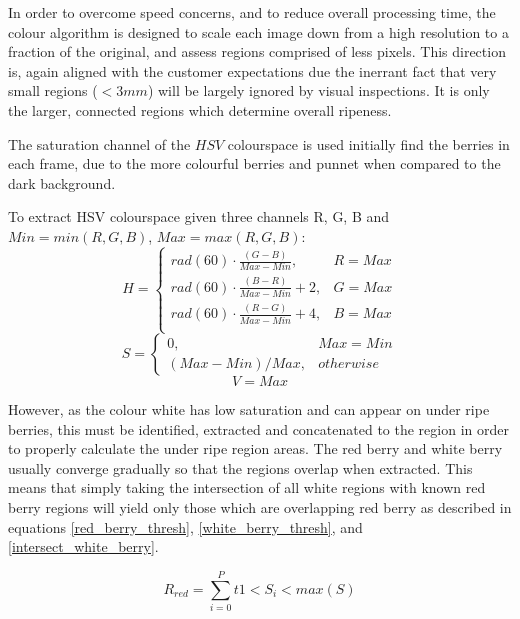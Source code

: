 \documentclass[fleqn,twoside,12pt]{report}
\begin{document}
In order to overcome speed concerns, and to reduce overall processing time, the colour algorithm is designed to scale each image down from a high resolution to a fraction of the original, and assess regions comprised of less pixels. This direction is, again aligned with the customer expectations due the inerrant fact that very small regions ($<3mm$) will be largely ignored by visual inspections. It is only the larger, connected regions which determine overall ripeness.

The saturation channel of the $HSV$ colourspace is used initially find the berries in each frame, due to the more colourful berries and punnet when compared to the dark background. 

To extract HSV colourspace given three channels R, G, B and $Min = min(R, G, B)$, $Max = max(R, G, B)$:
\begin{equation}
H = 
\begin{cases} 
rad(60) \cdot \frac{(G-B)}{Max-Min}, & R=Max \\
rad(60) \cdot \frac{(B-R)}{Max-Min} + 2, & G=Max \\
rad(60) \cdot \frac{(R-G)}{Max-Min} + 4, & B=Max \\   
\end{cases}
\end{equation}
\begin{equation}
S = 
\begin{cases} 
0, & Max=Min \\   
(Max-Min)/Max, & otherwise        
\end{cases}
\end{equation}
\begin{equation}
V = Max
\end{equation}


However, as the colour white has low saturation and can appear on under ripe berries, this must be identified, extracted and concatenated to the region in order to properly calculate the under ripe region areas. The red berry and white berry usually converge gradually so that the regions overlap when extracted. This means that simply taking the intersection of all white regions with known red berry regions will yield only those which are overlapping red berry as described in equations \ref{red_berry_thresh}, \ref{white_berry_thresh}, and \ref{intersect_white_berry}.

\begin{equation}
R_{red} = \sum_{i=0}^{P}t1<S_i<max(S)
\label{red_berry_thresh}
\end{equation}
\end{document}
